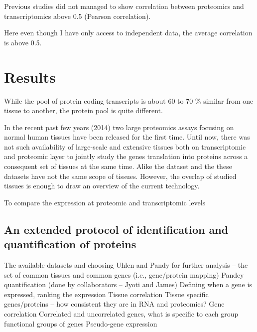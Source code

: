 Previous studies did not managed to show correlation between proteomics and
transcriptomics above 0.5 (Pearson correlation).

Here even though I have only access to independent data, the average correlation is above 0.5.


\section{Results}

While the pool of protein coding transcripts is about 60 to 70 \% similar from one tissue to another, the protein pool is quite different.

In the recent past few years (2014) two large proteomics assays focusing on normal
human tissues have been released for the first time.
Until now, there was not such availability of large-scale and extensive tissues
both on transcriptomic and proteomic layer to jointly study the genes
translation into proteins across a consequent set of tissues
at the same time. Alike the  dataset and the 
these datasets have not the same scope of tissues. However, the overlap of
studied tissues is enough to draw an overview of the current technology.

To compare the expression at proteomic and transcriptomic levels


\subsection{An extended protocol of identification and quantification of proteins}


The available datasets and choosing Uhlen and Pandy for further analysis – the set of common tissues and common genes (i.e., gene/protein mapping)
Pandey quantification (done by collaborators – Jyoti and James)
Defining when a gene is expressed, ranking the expression
Tissue correlation
Tissue specific genes/proteins – how consistent they are in RNA and proteomics?
Gene correlation
Correlated and uncorrelated genes, what is specific to each group
functional groups of genes
Pseudo-gene expression




